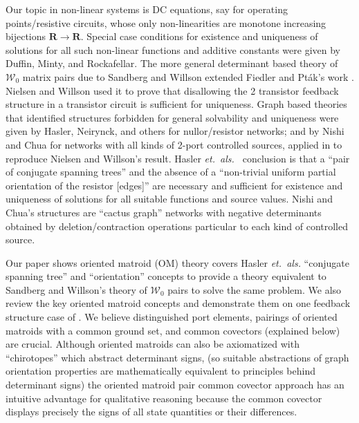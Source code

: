 \documentclass{amsproc-sunycstr}
\def\Reals{\ensuremath{\mathbf R}}
\theoremstyle{plain}
\theoremstyle{definition}
\theoremstyle{remark}
\begin{document}
Our topic in non-linear systems is DC equations, 
say for operating points/resistive circuits, whose only
non-linearities are 
monotone increasing bijections $\Reals\rightarrow\Reals$.  
Special case conditions
for existence and uniqueness of solutions for all 
such non-linear
functions and additive 
constants were given by Duffin, Minty,
and Rockafellar.  
The more general determinant based theory
of $\mathcal{W}_0$ matrix pairs due to Sandberg and Willson 
\cite{SWExistancePf} extended Fiedler and Pt\'{a}k's work \cite{FiedlerPtak}.
Nielsen and Willson \cite{NielWillpaper}
used it to prove 
that disallowing the 2 transistor feedback structure in a transistor circuit
is sufficient for uniqueness.
Graph based theories that identified structures forbidden for general
solvability and uniqueness were given by 
Hasler, Neirynck, and others \cite{HaslerDApplMath,HaslerNeirynck,Fosseprez}
for nullor/resistor networks; and by Nishi and Chua 
\cite{NishiChuaCactus,NishiChuaCCCS} for networks with all kinds of 2-port
controlled sources, applied in \cite{NishiChuaTransFB} to 
reproduce Nielsen and Willson's result.  
Hasler \textit{et.\ als.\ } conclusion is that 
a ``pair of conjugate spanning trees'' and the absence of a
``non-trivial uniform partial orientation of the resistor [edges]''
are necessary and sufficient for existence and uniqueness of solutions
for all suitable functions and source values.  Nishi and Chua's structures
are ``cactus graph'' networks with negative determinants obtained by 
deletion/contraction operations particular to each kind of controlled source.

Our paper shows 
oriented matroid (OM) theory \cite{BachemKern,OMBOOK}
covers
Hasler \textit{et.\ als.}
``conjugate spanning tree'' and ``orientation'' concepts to 
provide a theory equivalent to Sandberg and Willson's theory of 
$\mathcal{W}_0$ 
pairs 
to solve 
the same problem.  
We also review the key oriented matroid concepts and 
demonstrate them on one feedback structure case of
\cite{TrajWillNDR}.
We believe distinguished port elements,
pairings of oriented matroids with a common ground set,
and common covectors (explained below) are crucial.
Although oriented matroids can 
also be axiomatized with ``chirotopes''
which abstract determinant signs, 
(so suitable abstractions of graph orientation properties are
mathematically equivalent to principles behind determinant signs)
the oriented matroid pair
common covector approach has an intuitive
advantage for qualitative reasoning because
the common covector displays precisely 
the signs of all state quantities or their differences.
\end{document}
